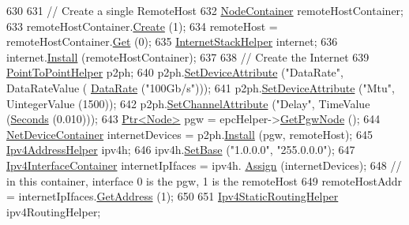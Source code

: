\begin{DoxyCode}
630 
631       \textcolor{comment}{// Create a single RemoteHost}
632       \hyperlink{classns3_1_1NodeContainer}{NodeContainer} remoteHostContainer;
633       remoteHostContainer.\hyperlink{classns3_1_1NodeContainer_a787f059e2813e8b951cc6914d11dfe69}{Create} (1);
634       remoteHost = remoteHostContainer.\hyperlink{classns3_1_1NodeContainer_a9ed96e2ecc22e0f5a3d4842eb9bf90bf}{Get} (0);
635       \hyperlink{classns3_1_1InternetStackHelper}{InternetStackHelper} internet;
636       internet.\hyperlink{classns3_1_1InternetStackHelper_a6645b412f31283d2d9bc3d8a95cebbc0}{Install} (remoteHostContainer);
637 
638       \textcolor{comment}{// Create the Internet}
639       \hyperlink{classns3_1_1PointToPointHelper}{PointToPointHelper} p2ph;
640       p2ph.\hyperlink{classns3_1_1PointToPointHelper_a4577f5ab8c387e5528af2e0fbab1152e}{SetDeviceAttribute} (\textcolor{stringliteral}{"DataRate"}, DataRateValue (
      \hyperlink{classns3_1_1DataRate}{DataRate} (\textcolor{stringliteral}{"100Gb/s"})));
641       p2ph.\hyperlink{classns3_1_1PointToPointHelper_a4577f5ab8c387e5528af2e0fbab1152e}{SetDeviceAttribute} (\textcolor{stringliteral}{"Mtu"}, UintegerValue (1500));
642       p2ph.\hyperlink{classns3_1_1PointToPointHelper_a6b5317fd17fb61e5a53f8d66a90b63b9}{SetChannelAttribute} (\textcolor{stringliteral}{"Delay"}, TimeValue (\hyperlink{group__timecivil_ga33c34b816f8ff6628e33d5c8e9713b9e}{Seconds} (0.010)));
643       \hyperlink{classns3_1_1Ptr}{Ptr<Node>} pgw = epcHelper->\hyperlink{classns3_1_1PointToPointEpcHelper_a828ac04ae81b0e323f9ccfc08bcacf21}{GetPgwNode} ();
644       \hyperlink{classns3_1_1NetDeviceContainer}{NetDeviceContainer} internetDevices = p2ph.\hyperlink{classns3_1_1PointToPointHelper_ab9162fea3e88722666fed1106df1f9ec}{Install} (pgw, remoteHost);
645       \hyperlink{classns3_1_1Ipv4AddressHelper}{Ipv4AddressHelper} ipv4h;
646       ipv4h.\hyperlink{classns3_1_1Ipv4AddressHelper_acf7b16dd25bac67e00f5e25f90a9a035}{SetBase} (\textcolor{stringliteral}{"1.0.0.0"}, \textcolor{stringliteral}{"255.0.0.0"});
647       \hyperlink{classns3_1_1Ipv4InterfaceContainer}{Ipv4InterfaceContainer} internetIpIfaces = ipv4h.
      \hyperlink{classns3_1_1Ipv4AddressHelper_af8e7f4a1a7e74c00014a1eac445a27af}{Assign} (internetDevices);
648       \textcolor{comment}{// in this container, interface 0 is the pgw, 1 is the remoteHost}
649       remoteHostAddr = internetIpIfaces.\hyperlink{classns3_1_1Ipv4InterfaceContainer_ae63208dcd222be986822937ee4aa828c}{GetAddress} (1);
650 
651       \hyperlink{classns3_1_1Ipv4StaticRoutingHelper}{Ipv4StaticRoutingHelper} ipv4RoutingHelper;

\end{DoxyCode}
